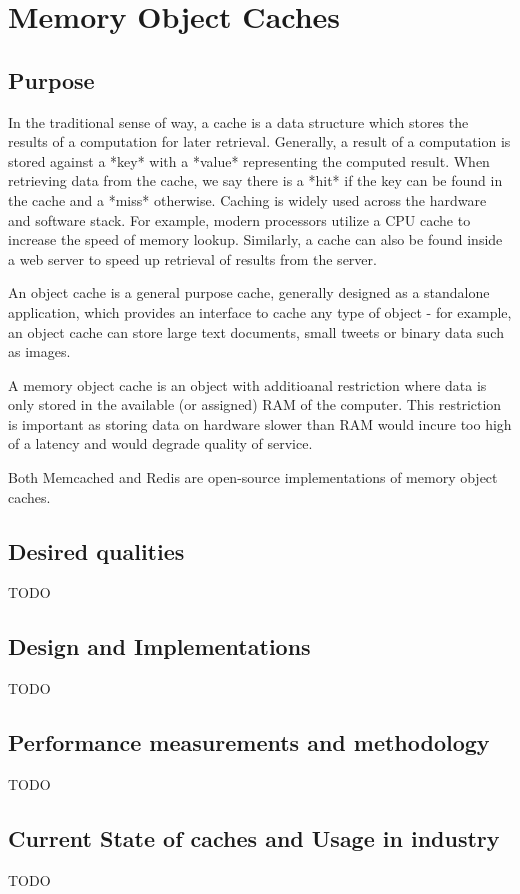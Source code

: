 \section{Memory Object Caches}

\subsection{Purpose}
In the traditional sense of way, a cache is a data structure which stores the results of a computation for later retrieval. Generally, a result of a computation is stored against a *key* with a *value* representing the computed result. When retrieving data from the cache, we say there is a *hit* if the key can be found in the cache and a *miss* otherwise. Caching is widely used across the hardware and software stack. For example, modern processors utilize a CPU cache to increase the speed of memory lookup. Similarly, a cache can also be found inside a web server to speed up retrieval of results from the server.

An object cache is a general purpose cache, generally designed as a standalone application, which provides an interface to cache any type of object - for example, an object cache can store large text documents, small tweets or binary data such as images.

A memory object cache is an object with additioanal restriction where data is only stored in the available (or assigned) RAM of the computer. This restriction is important as storing data on hardware slower than RAM would incure too high of a latency and would degrade quality of service.

Both Memcached and Redis are open-source implementations of memory object caches.


\subsection{Desired qualities}
TODO

\subsection{Design and Implementations}
TODO

\subsection{Performance measurements and methodology}
TODO

\subsection{Current State of caches and Usage in industry}
TODO

